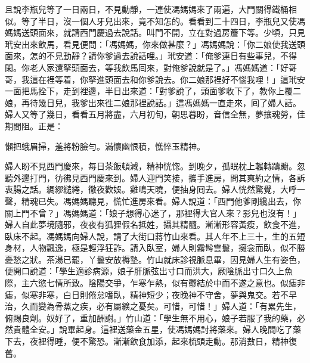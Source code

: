 且說李瓶兒等了一日兩日，不見動靜，一連使馮媽媽來了兩遍，大門關得鐵桶相似。等了半日，沒一個人牙兒出來，竟不知怎的。看看到二十四日，李瓶兒又使馮媽媽送頭面來，就請西門慶過去說話。叫門不開，立在對過房簷下等。少頃，只見玳安出來飲馬，看見便問：「馮媽媽，你來做甚麼？」馮媽媽說：「你二娘使我送頭面來，怎的不見動靜？請你爹過去說話哩。」玳安道：「俺爹連日有些事兒，不得閑。你老人家還拏頭面去，等我飲馬囘來，對俺爹說就是了。」馮媽媽道：「好哥哥，我這在裡等着，你拏進頭面去和你爹說去。你二娘那裡好不惱我哩！」這玳安一面把馬拴下，走到裡邊，半日出來道：「對爹說了，頭面爹收下了，教你上覆二娘，再待幾日兒，我爹出來徃二娘那裡說話。」這馮媽媽一直走來，囘了婦人話。婦人又等了幾日，看看五月將盡，六月初旬，朝思暮盼，音信全無，夢攘魂勞，佳期間阻。正是：

懶把蛾眉掃，羞將粉臉勻。滿懷幽恨積，憔悴玉精神。

婦人盼不見西門慶來，每日茶飯頓減，精神恍惚。到晚夕，孤眠枕上輾轉躊躕。忽聽外邊打門，彷彿見西門慶來到。婦人迎門笑接，攜手進房，問其爽約之情，各訴衷腸之話。綢繆繾綣，徹夜歡娛。雞鳴天曉，便抽身囘去。婦人恍然驚覺，大呼一聲，精魂已失。馮媽媽聽見，慌忙進房來看。婦人說道：「西門他爹剛纔出去，你關上門不曾？」馮媽媽道：「娘子想得心迷了，那裡得大官人來？影兒也沒有！」婦人自此夢境隨邪，夜夜有狐狸假名抵姓，攝其精髓。漸漸形容黃瘦，飲食不進，臥床不起。馮媽媽向婦人說，請了大街口蔣竹山來看。其人年不上三十，生的五短身材，人物飄逸，極是輕浮狂詐。請入臥室，婦人則霧髩雲鬟，{}擁衾而臥，{}似不勝憂愁之狀。茶湯已罷，丫鬟安放褥墊。竹山就床診視脈息畢，因見婦人生有姿色，{}便開口說道：「學生適診病源，娘子肝脈弦出寸口而洪大，厥陰脈出寸口久上魚際，主六慾七情所致。陰陽交爭，乍寒乍熱，似有鬱結於中而不遂之意也。似瘧非瘧，似寒非寒，白日則倦怠嗜臥，精神短少；夜晚神不守舍，夢與鬼交。若不早治，久而變為骨蒸之疾，必有屬纊之憂矣。可惜，可惜！」婦人道：「有累先生，俯賜良劑。奴好了，重加酬謝。」竹山道：「學生無不用心，娘子若服了我的藥，必然貴體全安。」說畢起身。這裡送藥金五星，使馮媽媽討將藥來。婦人晚間吃了藥下去，夜裡得睡，便不驚恐。漸漸飲食加添，起來梳頭走動。那消數日，精神復舊。{}

